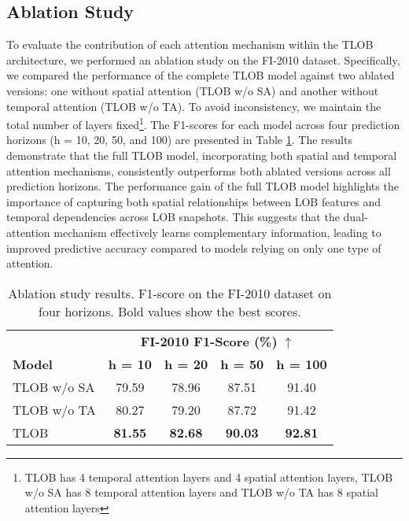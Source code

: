\subsection{Ablation Study}
\label{sec:ablation}
To evaluate the contribution of each attention mechanism within the TLOB architecture, we performed an ablation study on the FI-2010 dataset. Specifically, we compared the performance of the complete TLOB model against two ablated versions: one without spatial attention (TLOB w/o SA) and another without temporal attention (TLOB w/o TA). To avoid inconsistency, we maintain the total number of layers fixed\footnote{TLOB has 4 temporal attention layers and 4 spatial attention layers, TLOB w/o SA has 8 temporal attention layers and TLOB w/o TA has 8 spatial attention layers}. The F1-scores for each model across four prediction horizons (h = 10, 20, 50, and 100) are presented in Table \ref{tab:ablation}. The results demonstrate that the full TLOB model, incorporating both spatial and temporal attention mechanisms, consistently outperforms both ablated versions across all prediction horizons. The performance gain of the full TLOB model highlights the importance of capturing both spatial relationships between LOB features and temporal dependencies across LOB snapshots. This suggests that the dual-attention mechanism effectively learns complementary information, leading to improved predictive accuracy compared to models relying on only one type of attention.

\begin{table}[h!]
\centering
\begin{minipage}{0.48\textwidth}
\caption{Ablation study results. F1-score on the FI-2010 dataset on four horizons. 
Bold values show the best scores.} 
\label{tab:ablation}
\centering
        \begin{tabular}{l|cccc}
            \toprule
            & \multicolumn{4}{c}{\textbf{FI-2010 F1-Score (\%) } $\uparrow$} \\
            \cmidrule(lr){2-5} 
            \textbf{Model} & \textbf{h = 10} & \textbf{h = 20} & \textbf{h = 50} & \textbf{h = 100} \\
            \midrule
            TLOB w/o SA & 79.59 & 78.96 &  87.51 & 91.40 \\
            TLOB w/o TA & 80.27 & 79.20  & 87.72 & 91.42 \\
            \midrule
            TLOB & \textbf{81.55} & \textbf{82.68} & \textbf{90.03} & \textbf{92.81} \\
            \bottomrule
        \end{tabular}
        \end{minipage}
\end{table}